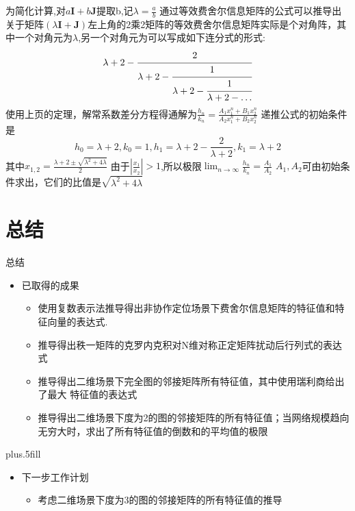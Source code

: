 \documentclass[notheorems,xetex,mathserif,serif]{beamer}
\begin{document}
\begin{frame}
为简化计算,对$a\bm{I}+b\bm{J}$提取b,记$\lambda=\frac{a}{b}$
通过等效费舍尔信息矩阵的公式可以推导出关于矩阵$(\lambda\bm{I}+\bm{J})$左上角的2乘2矩阵的等效费舍尔信息矩阵实际是个对角阵，其中一个对角元为$\lambda$,另一个对角元为可以写成如下连分式的形式:
\[
\lambda+2-\cfrac{2}{\lambda+2-\cfrac{1}{\lambda+2-\cfrac{1}{\lambda+2-\dots}}}
\]
使用上页的定理，解常系数差分方程得通解为$\frac{h_n}{k_n}=\frac{A_1x_1^n+B_1x_2^n}{A_2x_1^n+B_2x_2^n}$
递推公式的初始条件是
\vspace{-2mm}
\[
h_0=\lambda+2,k_0=1,h_1=\lambda+2-\frac{2}{\lambda+2},k_1=\lambda+2
\]
其中$x_{1,2}=\frac{\lambda+2\pm \sqrt{\lambda^2+4\lambda}}{2}$
由于$|\frac{x_1}{x_2}|>1$,所以极限$\lim_{n\to \infty}\frac{h_n}{k_n}=\frac{A_1}{A_2}$
$A_1,A_2$可由初始条件求出，它们的比值是$\sqrt{\lambda^2+4\lambda}$
\end{frame}
\section*{总结}

\begin{frame}{总结}

  \begin{itemize}
  \item
    已取得的成果
  \begin{itemize}
  \item
    使用复数表示法推导得出非协作定位场景下费舍尔信息矩阵的特征值和特征向量的表达式.
  \item
    推导得出秩一矩阵的克罗内克积对N维对称正定矩阵扰动后行列式的表达式
  \item
    推导得出二维场景下完全图的邻接矩阵所有特征值，其中使用瑞利商给出了最大 特征值的表达式
    \item 推导得出二维场景下度为2的图的邻接矩阵的所有特征值；当网络规模趋向无穷大时，求出了所有特征值的倒数和的平均值的极限
  \end{itemize}
  \end{itemize}
  \vskip0pt plus.5fill
  \begin{itemize}
  \item
    下一步工作计划
    \begin{itemize}
    \item
      考虑二维场景下度为3的图的邻接矩阵的所有特征值的推导
    \end{itemize}
  \end{itemize}
\end{frame}
\end{document}
